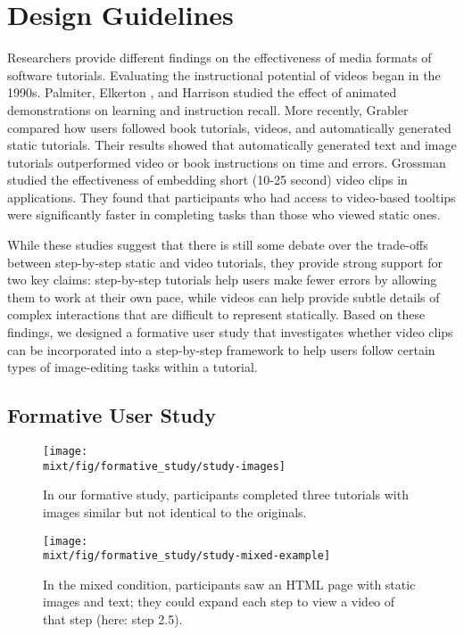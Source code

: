 \section{Design Guidelines}
\label{mixt_guidelines}

Researchers provide different findings on the effectiveness of media formats of software tutorials. Evaluating the instructional potential of videos began in the 1990s. Palmiter, Elkerton \cite{Palmiter:1991:ADV:107792.107797,Palmiter:1993:ADL:1461829.1461830}, and Harrison \cite{Harrison:1995uh} studied the effect of animated demonstrations on learning and instruction recall. More recently, Grabler \ea{}~\cite{Grabler:2009jj} compared how users followed book tutorials, videos, and automatically generated static tutorials. Their results showed that automatically generated text and image tutorials outperformed video or book instructions on time and errors. Grossman \ea{}~\cite{Grossman:2010wr} studied the effectiveness of embedding short (10-25 second) video clips in applications. They found that participants who had access to video-based tooltips were significantly faster in completing tasks than those who viewed static ones.

While these studies suggest that there is still some debate over the trade-offs between step-by-step static and video tutorials, they provide strong support for two key claims: step-by-step tutorials help users make fewer errors by allowing them to work at their own pace, while videos can help provide subtle details of complex interactions that are difficult to represent statically. Based on these findings, we designed a formative user study that investigates whether video clips can be incorporated into a step-by-step framework to help users follow certain types of image-editing tasks within a tutorial.

\subsection{Formative User Study}

\begin{figure*}[t]
  \centering
  \texttt{[image: \\mixt/fig/formative\_study/study-images]}
  \caption{In our formative study, participants completed three tutorials with images similar but not identical to the originals.}
  \label{fig:formative_tasks}
\end{figure*}

\begin{figure*}[t]
  \centering
  \texttt{[image: \\mixt/fig/formative\_study/study-mixed-example]}
  \caption{In the mixed condition, participants saw an HTML page with static images and text; they could expand each step to view a video of that step (here: step 2.5).}
  \label{fig:formative_mixt}
\end{figure*}

